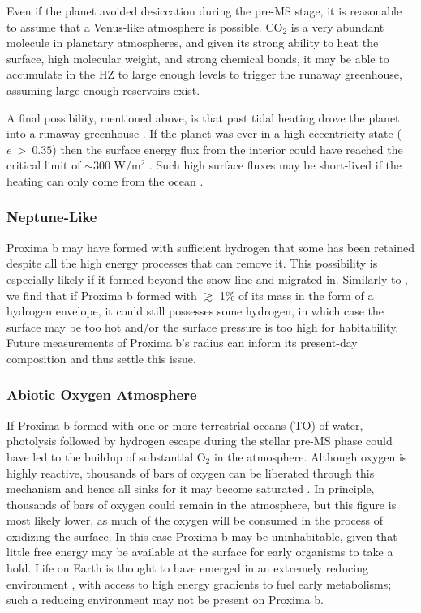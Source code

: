 \documentclass[preprint,12pt]{aastex}
\begin{document}
Even if the planet avoided desiccation during the pre-MS stage, it is
reasonable to assume that a Venus-like atmosphere is possible. CO$_2$
is a very abundant molecule in planetary atmospheres, and given its
strong ability to heat the surface, high molecular weight, and strong
chemical bonds, it may be able to accumulate in the HZ to large enough
levels to trigger the runaway greenhouse, assuming large enough
reservoirs exist.

A final possibility, mentioned above, is that past tidal heating drove
the planet into a runaway greenhouse \citep{Barnes13}. If the planet
was ever in a high eccentricity state ($e~>~0.35$) then the surface
energy flux from the interior could have reached the critical limit of
$\sim$300 W/m$^2$ \citep{Kasting93,Abe93,Goldblatt15}. Such high
surface fluxes may be short-lived if the heating can only come from
the ocean \citep{DriscollBarnes15}.

\subsubsection{Neptune-Like}
\label{sec:results:atmstates:neptunelike}

Proxima b may have formed with sufficient hydrogen that some has been
retained despite all the high energy processes that can remove
it. This possibility is especially likely if it formed beyond the snow
line and migrated in. Similarly to \cite{OwenMohanty16}, we find that
if Proxima b formed with $\gtrsim$ 1\% of its mass in the form of a
hydrogen envelope, it could still possesses some hydrogen, in which
case the surface may be too hot and/or the surface pressure is too
high for habitability.  Future measurements of Proxima b's radius can
inform its present-day composition and thus settle this issue.

\subsubsection{Abiotic Oxygen Atmosphere}
\label{sec:results:atmstates:o2atmos}

If Proxima b formed with one or more terrestrial oceans (TO) of water, photolysis followed
by hydrogen escape during the stellar pre-MS phase could have led to
the buildup of substantial O$_2$ in the atmosphere. Although oxygen is
highly reactive, thousands of bars of oxygen can be liberated through
this mechanism \citep{LugerBarnes15} and hence all sinks for it may
become saturated \citep{Schaefer16}. In principle, thousands of bars
of oxygen could remain in the atmosphere, but this figure is most
likely lower, as much of the oxygen will be consumed in the process of
oxidizing the surface.  In this case Proxima b may be uninhabitable,
given that little free energy may be available at the surface for
early organisms to take a hold. Life on Earth is thought to have
emerged in an extremely reducing environment \citep{Oparin24,
  Haldane29}, with access to high energy gradients to fuel early
metabolisms; such a reducing environment may not be present on Proxima b.
\end{document}
